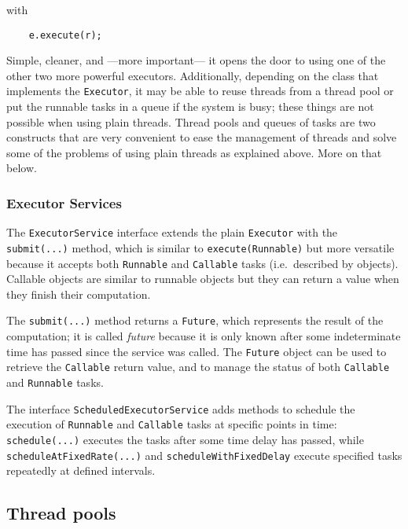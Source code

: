 with 

\begin{verbatim}
    e.execute(r);
\end{verbatim}

Simple, cleaner, and ---more important--- it opens the door to using
one of the other two more powerful executors. Additionally, depending
on the class that implements the \verb+Executor+, it may be able to
reuse threads from a thread pool or put the runnable tasks in a queue
if the system is busy; these things are not possible when using plain
threads. Thread pools and queues of tasks are two constructs that
are very convenient to ease the management of threads and solve some
of the problems of using plain threads as explained above. More on
that below. 

\subsubsection{Executor Services}
\label{sec:executor-services}

The \verb+ExecutorService+ interface extends the plain \verb+Executor+
with the \verb+submit(...)+ method, which is similar to
\verb+execute(Runnable)+ but more versatile because it accepts both
\verb+Runnable+ and \verb+Callable+ tasks (i.e.~described by
objects). Callable objects are similar to runnable objects but they
can return a value when they finish their computation. 

The \verb+submit(...)+ method returns a \verb+Future+, which represents
the result of the computation; it is called \emph{future} because it
is only known after some indeterminate time has passed since the service
was called. The \verb+Future+ object can be used to retrieve the
\verb+Callable+ return value, 
and to manage the status of both \verb+Callable+ and
\verb+Runnable+ tasks. 


The interface \verb+ScheduledExecutorService+ adds methods to schedule
the execution of \verb+Runnable+ and \verb+Callable+ tasks at specific
points in time: \verb+schedule(...)+ executes the tasks after some
time delay has passed, while \verb+scheduleAtFixedRate(...)+ and
\verb+scheduleWithFixedDelay+ execute specified tasks repeatedly at 
defined intervals. 


\subsection{Thread pools}
\label{sec:thread-pools}

